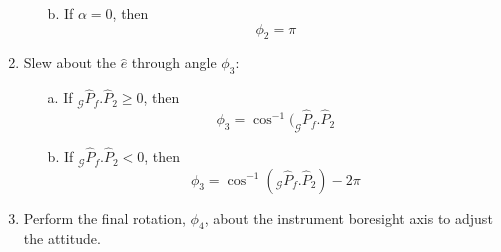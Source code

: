 \documentclass{article}
\begin{document}
\begin{enumerate}
\begin{enumerate}
				\item[b.] If $\alpha = 0$, then 
					\begin{equation}
					\phi_2 = \pi
					\end{equation}
				
			\end{enumerate}
			
		\item Slew about the $\hat{e}$ through angle $\phi_3$:
		
			\begin{enumerate}
				\item[a.] If $_\mathcal{G}\hat{P}_f.\hat{P}_2\geq 0$, then 
					\begin{equation}
					\phi_3 = \cos^{-1}(_\mathcal{G}\hat{P}_f.\hat{P}_2
					\end{equation}
				
				\item[b.] If $_\mathcal{G}\hat{P}_f.\hat{P}_2<0$, then 
					\begin{equation}
					\phi_3 = \cos^{-1}(_\mathcal{G}\hat{P}_f.\hat{P}_2)-2\pi
					\end{equation}
				
				
			\end{enumerate}
		
		\item Perform the final rotation, $\phi_4$, about the instrument boresight axis to adjust the attitude. 
		
	\end{enumerate}
\end{document}
